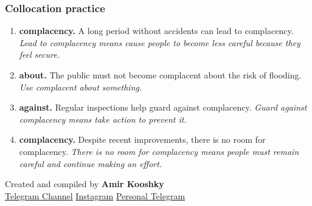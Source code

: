 \documentclass[11pt]{article}
\begin{document}
\subsubsection{Collocation practice}
\begin{enumerate}
  \item \textbf{complacency.} A long period without accidents can lead to complacency. \emph{Lead to complacency means cause people to become less careful because they feel secure.}
  \item \textbf{about.} The public must not become complacent about the risk of flooding. \emph{Use complacent about something.}
  \item \textbf{against.} Regular inspections help guard against complacency. \emph{Guard against complacency means take action to prevent it.}
  \item \textbf{complacency.} Despite recent improvements, there is no room for complacency. \emph{There is no room for complacency means people must remain careful and continue making an effort.}
\end{enumerate}

\vfill
\begin{center}
\small\color{Muted} Created and compiled by \textbf{Amir Kooshky}\\
\href{https://t.me/KooshkyTOEFL}{Telegram Channel}\quad\textbullet\quad
\href{https://www.instagram.com/kooshkytoefl}{Instagram}\quad\textbullet\quad
\href{https://t.me/KooshkyTOEFL\_pv}{Personal Telegram}
\end{center}
\end{document}
